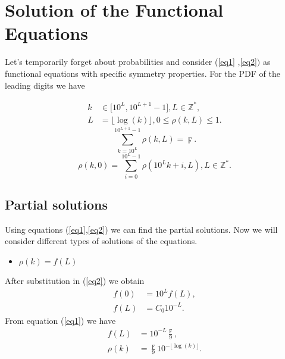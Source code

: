 \documentclass[titlepage,fleqn]{article}%
\providecommand{\U}[1]{\protect\rule{.1in}{.1in}}
\begin{document}
\appendix


\section{Solution of the Functional Equations}%

\label{SofFE}%


Let's temporarily forget about probabilities and consider (\ref{eq1}%
,\ref{eq2}$)$ as functional equations with specific symmetry properties. For
the PDF of the leading digits we have%

\begin{align*}
k &  \in\lbrack10^{L},10^{L+1}-1],L\in%
\mathbb{Z}
^{\ast},\\
L &  =\lfloor\log(k)\rfloor,0\leq\rho(k,L)\leq1.
\end{align*}%
\begin{equation}%
{\displaystyle\sum\limits_{k=10^{L}}^{10^{L+1}-1}}
\rho(k,L)=\digamma.\label{eq1}%
\end{equation}%
\begin{equation}
\rho(k,0)=%
{\displaystyle\sum\limits_{i=0}^{10^{L}-1}}
\rho(10^{L}k+i,L),L\in%
\mathbb{Z}
^{\ast}.\label{eq2}%
\end{equation}


\subsection{Partial solutions}%

\label{PartialSolutions}%
Using equations (\ref{eq1},\ref{eq2}) we can find the partial solutions. Now
we will consider different types of solutions of the equations.

\begin{itemize}
\item $\rho(k)=f(L)$
\end{itemize}

After substitution in (\ref{eq2}) we obtain%
\begin{align*}
f(0)  &  =10^{L}f(L),\\
f(L)  &  =C_{0}10^{-L}.
\end{align*}
From equation (\ref{eq1}) we have%
\begin{align}
f(L)  &  =10^{-L}\frac{\digamma}{9},\label{SolL}\\
\rho(k)  &  =\frac{\digamma}{9}10^{-\lfloor\log(k)\rfloor}.\nonumber
\end{align}
\end{document}
